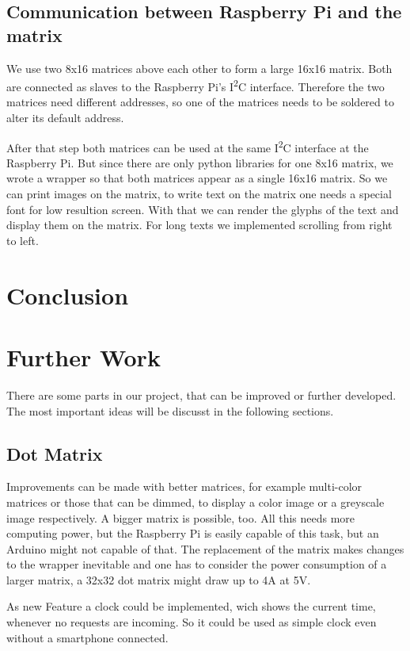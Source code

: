 \documentclass[conference]{IEEEtran}
\begin{document}
\subsection{Communication between Raspberry Pi and the matrix}
We use two 8x16 matrices above each other to form a large 16x16 matrix. Both are connected as slaves to the Raspberry Pi's I\textsuperscript{2}C interface. Therefore the two matrices need different addresses, so one of the matrices needs to be soldered to alter its default address.

After that step both matrices can be used at the same I\textsuperscript{2}C interface at the Raspberry Pi. But since there are only python libraries for one 8x16 matrix, we wrote a wrapper so that both matrices appear as a single 16x16 matrix. So we can print images on the matrix, to write text on the matrix one needs a special font for low resultion screen. With that we can render the glyphs of the text and display them on the matrix. For long texts we implemented scrolling from right to left.


\section{Conclusion}



\section{Further Work}
There are some parts in our project, that can be improved or further developed. The most important ideas will be discusst in the following sections.

\subsection{Dot Matrix}
Improvements can be made with better matrices, for example multi-color matrices or those that can be dimmed, to display a color image or a greyscale image respectively. A bigger matrix is possible, too. All this needs more computing power, but the Raspberry Pi is easily capable of this task, but an Arduino might not capable of that. The replacement of the matrix makes changes to the wrapper inevitable and one has to consider the power consumption of a larger matrix, a 32x32 dot matrix might draw up to 4A at 5V.

As new Feature a clock could be implemented, wich shows the current time, whenever no requests are incoming. So it could be used as simple clock even without a smartphone connected.
\end{document}
